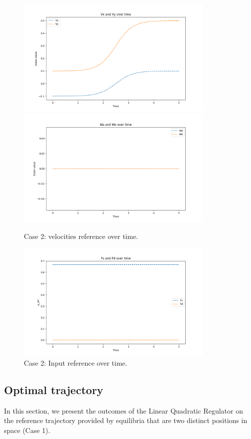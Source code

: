 \begin{figure}[H]
  \centering
  \includegraphics[width=0.85\textwidth]{pictures/Figure_3_velocita_smooth}\hfill \\
  \includegraphics[width=0.85\textwidth]{pictures/Figure_4_velocita_smooth}\hfill
  \caption{Case 2: velocities reference over time.}
  \label{fig:Reference trajectory}
  \includegraphics[width=0.85\textwidth]{pictures/Figure_5_velocita_smooth}
  \caption{Case 2: Input reference over time.}
  \label{fig:Reference trajectory}
\end{figure}

\subsection{Optimal trajectory}
In this section, we present the outcomes of the Linear Quadratic Regulator on the reference trajectory provided by equilibria that are two distinct positions in space (Case 1).

